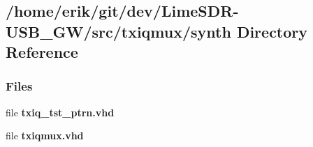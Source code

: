 \subsection{/home/erik/git/dev/\+Lime\+S\+D\+R-\/\+U\+S\+B\+\_\+\+G\+W/src/txiqmux/synth Directory Reference}
\label{dir_195a164a263796e97693d5e7cc49152d}
\subsubsection*{Files}
\begin{DoxyCompactItemize}
\item 
file {\bf txiq\+\_\+tst\+\_\+ptrn.\+vhd}
\item 
file {\bf txiqmux.\+vhd}
\end{DoxyCompactItemize}
